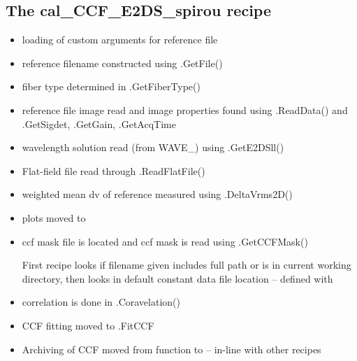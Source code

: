 \subsection{The cal\_CCF\_E2DS\_spirou recipe}
\label{ch:changelog:At4:cal_CCF_E2DS_spirou}

\begin{itemize}
\item loading of custom arguments for reference file

\item reference filename constructed using \spirouStartup.GetFile()

\item fiber type determined in \spirouStartup.GetFiberType()

\item reference file image read and image properties found using \spirouImage.ReadData() and \spirouImage.GetSigdet, \spirouImage.GetGain, \spirouImage.GetAcqTime

\item wavelength solution read (from WAVE\_) using \spirouTHORCA.GetE2DSll()

\item Flat-field file read through \spirouImage.ReadFlatFile()

\item weighted mean dv of reference measured using \spirouRV.DeltaVrms2D()

\item plots moved to \spirouPlot

\item ccf mask file is located and ccf mask is read using \spirouRV.GetCCFMask()
	\begin{note}
	First recipe looks if filename given includes full path or is in current working directory, then looks in default constant data file location -- defined with 
	\end{note}

\item correlation is done in \spirouRV.Coravelation()

\item CCF fitting moved to \spirouRV.FitCCF

\item Archiving of CCF moved from function to \progMAIN -- in-line with other recipes

\end{itemize}


